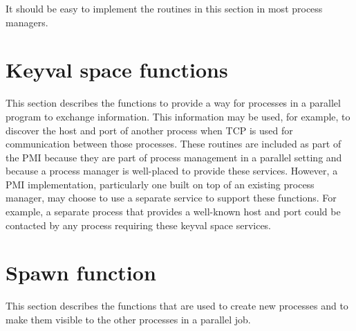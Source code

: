 \documentclass{article}
\begin{document}
It should be easy to implement the routines in this section in most process
managers. 














%

\section{Keyval space functions}
This section describes the functions to provide a way for processes in a
parallel program to exchange information.  This information may be used, for
example, to discover the host and port of another process when TCP is used for
communication between those processes.  These routines are included as part of
the PMI because they are part of process management in a parallel setting and
because a process manager is well-placed to provide these services.  However,
a PMI implementation, particularly one built on top of an existing process
manager, may choose to use a separate service to support these functions.
For example, a separate process that provides a well-known host and port could
be contacted by any process requiring these keyval space services.













\section{Spawn function}
This section describes the functions that are used to create new processes and
to make them visible to the other processes in a parallel job.  








\end{document}
